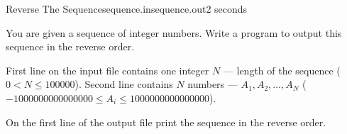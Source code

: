 \begin{problem}{Reverse The Sequence}{sequence.in}{sequence.out}{2 seconds}

You are given a sequence of integer numbers. 
Write a program to output this sequence in the reverse order.

\InputFile

First line on the input file contains one integer $N$ --- length of the 
sequence ($0 < N \le 100000$). Second line contains $N$ numbers --- 
$A_1, A_2, \dots, A_N$ ($-1000000000000000 \le A_i \le 1000000000000000$).

\OutputFile

On the first line of the output file print the sequence in the reverse order.

\Example

\begin{example}[*]
%
%
\end{example}

\end{problem}
